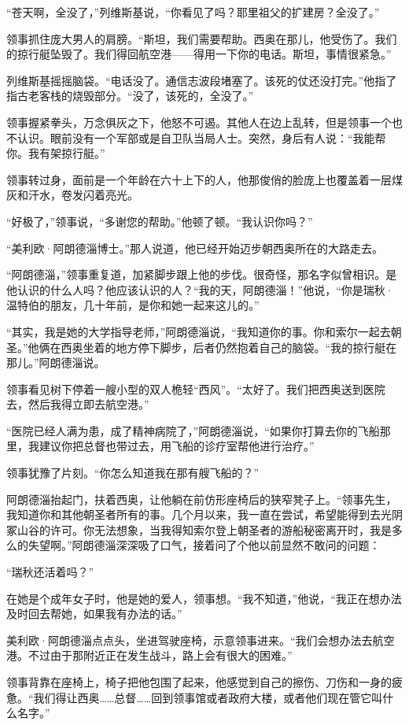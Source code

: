 \documentclass[AutoFakeBold=true]{book}
\begin{document}
``苍天啊，全没了，''列维斯基说，``你看见了吗？耶里祖父的扩建房？全没了。''

领事抓住庞大男人的肩膀。``斯坦，我们需要帮助。西奥在那儿，他受伤了。我们的掠行艇坠毁了。我们得回航空港——得用一下你的电话。斯坦，事情很紧急。''

列维斯基摇摇脑袋。``电话没了。通信志波段堵塞了。该死的仗还没打完。''他指了指古老客栈的烧毁部分。``没了，该死的，全没了。''

领事握紧拳头，万念俱灰之下，他怒不可遏。其他人在边上乱转，但是领事一个也不认识。眼前没有一个军部或是自卫队当局人士。突然，身后有人说：``我能帮你。我有架掠行艇。''

领事转过身，面前是一个年龄在六十上下的人，他那俊俏的脸庞上也覆盖着一层煤灰和汗水，卷发闪着亮光。

``好极了，''领事说，``多谢您的帮助。''他顿了顿。``我认识你吗？''

``美利欧·阿朗德淄博士。''那人说道，他已经开始迈步朝西奥所在的大路走去。

``阿朗德淄，''领事重复道，加紧脚步跟上他的步伐。很奇怪，那名字似曾相识。是他认识的什么人吗？他应该认识的人？``我的天，阿朗德淄！''他说，``你是瑞秋·温特伯的朋友，几十年前，是你和她一起来这儿的。''

``其实，我是她的大学指导老师，''阿朗德淄说，``我知道你的事。你和索尔一起去朝圣。''他俩在西奥坐着的地方停下脚步，后者仍然抱着自己的脑袋。``我的掠行艇在那儿。''阿朗德淄说。

领事看见树下停着一艘小型的双人桅轻``西风''。``太好了。我们把西奥送到医院去，然后我得立即去航空港。''

``医院已经人满为患，成了精神病院了，''阿朗德淄说，``如果你打算去你的飞船那里，我建议你把总督也带过去，用飞船的诊疗室帮他进行治疗。''

领事犹豫了片刻。``你怎么知道我在那有艘飞船的？''

阿朗德淄抬起门，扶着西奥，让他躺在前仿形座椅后的狭窄凳子上。``领事先生，我知道你和其他朝圣者所有的事。几个月以来，我一直在尝试，希望能得到去光阴冢山谷的许可。你无法想象，当我得知索尔登上朝圣者的游船秘密离开时，我是多么的失望啊。''阿朗德淄深深吸了口气，接着问了个他以前显然不敢问的问题：

``瑞秋还活着吗？''

{\kaishu 在她是个成年女子时，他是她的爱人，}领事想。``我不知道，''他说，``我正在想办法及时回去帮她，如果我有办法的话。''

美利欧·阿朗德淄点点头，坐进驾驶座椅，示意领事进来。``我们会想办法去航空港。不过由于那附近正在发生战斗，路上会有很大的困难。''

领事背靠在座椅上，椅子把他包围了起来，他感觉到自己的擦伤、刀伤和一身的疲惫。``我们得让西奥……总督……回到领事馆或者政府大楼，或者他们现在管它叫什么名字。''
\end{document}
